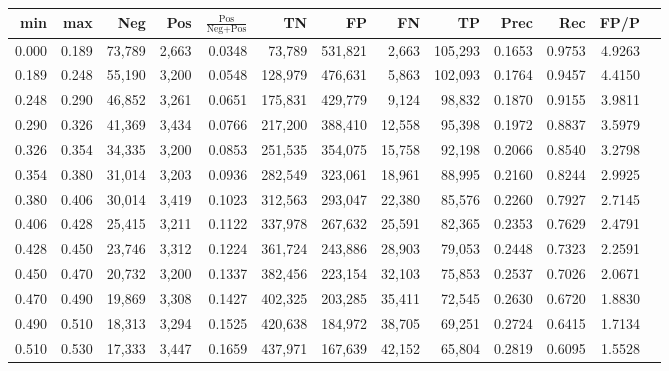 \begin{tabular}{rrrrrrrrrrrrr}
\toprule
  min &   max &    Neg &   Pos & $\frac{\text{Pos}}{\text{Neg}+\text{Pos}}$ &      TN &      FP &      FN &      TP &   Prec &    Rec &   FP/P \\
\midrule
0.000 & 0.189 & 73,789 & 2,663 &                                     0.0348 &  73,789 & 531,821 &   2,663 & 105,293 & 0.1653 & 0.9753 & 4.9263 \\
0.189 & 0.248 & 55,190 & 3,200 &                                     0.0548 & 128,979 & 476,631 &   5,863 & 102,093 & 0.1764 & 0.9457 & 4.4150 \\
0.248 & 0.290 & 46,852 & 3,261 &                                     0.0651 & 175,831 & 429,779 &   9,124 &  98,832 & 0.1870 & 0.9155 & 3.9811 \\
0.290 & 0.326 & 41,369 & 3,434 &                                     0.0766 & 217,200 & 388,410 &  12,558 &  95,398 & 0.1972 & 0.8837 & 3.5979 \\
0.326 & 0.354 & 34,335 & 3,200 &                                     0.0853 & 251,535 & 354,075 &  15,758 &  92,198 & 0.2066 & 0.8540 & 3.2798 \\
0.354 & 0.380 & 31,014 & 3,203 &                                     0.0936 & 282,549 & 323,061 &  18,961 &  88,995 & 0.2160 & 0.8244 & 2.9925 \\
0.380 & 0.406 & 30,014 & 3,419 &                                     0.1023 & 312,563 & 293,047 &  22,380 &  85,576 & 0.2260 & 0.7927 & 2.7145 \\
0.406 & 0.428 & 25,415 & 3,211 &                                     0.1122 & 337,978 & 267,632 &  25,591 &  82,365 & 0.2353 & 0.7629 & 2.4791 \\
0.428 & 0.450 & 23,746 & 3,312 &                                     0.1224 & 361,724 & 243,886 &  28,903 &  79,053 & 0.2448 & 0.7323 & 2.2591 \\
0.450 & 0.470 & 20,732 & 3,200 &                                     0.1337 & 382,456 & 223,154 &  32,103 &  75,853 & 0.2537 & 0.7026 & 2.0671 \\
0.470 & 0.490 & 19,869 & 3,308 &                                     0.1427 & 402,325 & 203,285 &  35,411 &  72,545 & 0.2630 & 0.6720 & 1.8830 \\
0.490 & 0.510 & 18,313 & 3,294 &                                     0.1525 & 420,638 & 184,972 &  38,705 &  69,251 & 0.2724 & 0.6415 & 1.7134 \\
0.510 & 0.530 & 17,333 & 3,447 &                                     0.1659 & 437,971 & 167,639 &  42,152 &  65,804 & 0.2819 & 0.6095 & 1.5528 \\

\end{tabular}
